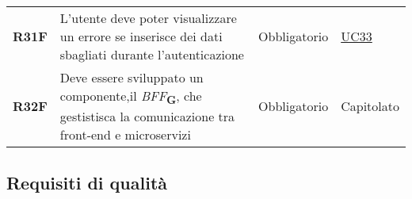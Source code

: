 \begin{center}
\begin{longtable}[!h]{p{50px} p{245px} p{75px} p{50px}}
        \textbf{R31F}                         & L'utente deve poter visualizzare un errore se inserisce dei dati sbagliati durante l'autenticazione                                                    & Obbligatorio             & \hyperref[sec:UC33]{UC33}                      \\
        \textbf{R32F}                         & Deve essere sviluppato un componente,\newline il \textit{BFF}\textsubscript{\textbf{G}}, che gestistisca la comunicazione tra front-end e microservizi & Obbligatorio             & Capitolato                                     \\
    \end{longtable}
\end{center}

\subsection{Requisiti di qualità}
